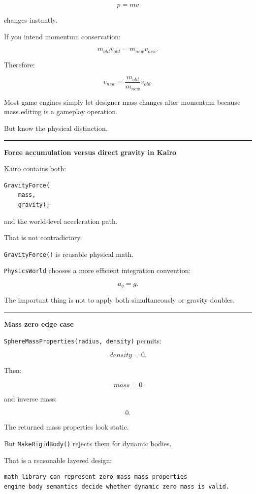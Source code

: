 \[
p=mv
\]

changes instantly.

If you intend momentum conservation:

\[
m_{old}v_{old}
=
m_{new}v_{new}.
\]

Therefore:

\[
v_{new}
=
\frac{m_{old}}{m_{new}}
v_{old}.
\]

Most game engines simply let designer mass changes alter momentum because mass editing is a gameplay operation.

But know the physical distinction.

\begin{center}\rule{0.5\linewidth}{0.5pt}\end{center}

\textbf{Force accumulation versus direct gravity in Kairo}

Kairo contains both:

\begin{verbatim}
GravityForce(
    mass,
    gravity);
\end{verbatim}

and the world-level acceleration path.

That is not contradictory.

\texttt{GravityForce()} is reusable physical math.

\texttt{PhysicsWorld} chooses a more efficient integration convention:

\[
a_g=g.
\]

The important thing is not to apply both simultaneously or gravity doubles.

\begin{center}\rule{0.5\linewidth}{0.5pt}\end{center}

\textbf{Mass zero edge case}

\texttt{SphereMassProperties(radius,\ density)} permits:

\[
density=0.
\]

Then:

\[
mass=0
\]

and inverse mass:

\[
0.
\]

The returned mass properties look static.

But \texttt{MakeRigidBody()} rejects them for dynamic bodies.

That is a reasonable layered design:

\begin{verbatim}
math library can represent zero-mass mass properties
engine body semantics decide whether dynamic zero mass is valid.
\end{verbatim}

